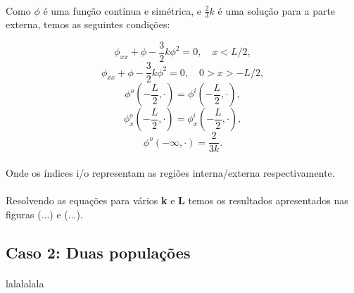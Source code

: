 \documentclass{article}
\begin{document}
	\paragraph{}
	Como $\phi$ é uma função contínua e simétrica, e $\frac{2}{3}k$ é uma solução para a parte externa, temos as seguintes condições:
	
	$$\phi_{xx} + \phi - \frac{3}{2}k\phi^2 = 0, \quad x < L/2,$$
	$$\phi_{xx} + \phi - \frac{3}{2}k\phi^2 = 0, \quad 0 > x > -L/2,$$
	$$\phi^o\left(-\frac{L}{2}, \cdot \right) = \phi^i\left(-\frac{L}{2}, \cdot \right),$$
	$$\phi^o_x\left(-\frac{L}{2}, \cdot \right) = \phi^i_x\left(-\frac{L}{2}, \cdot \right),$$
	$$\phi^o(- \infty, \cdot) = \frac{2}{3k}.$$
	
	\paragraph{}
	Onde os índices i/o representam as regiões interna/externa respectivamente.
	
	\paragraph{}
	Resolvendo as equações para vários \textbf{k} e \textbf{L} temos os resultados apresentados nas figuras (...) e (...).
	
	\subsection{Caso 2: Duas populações}
	\paragraph{}
	lalalalala
		
\end{document}
